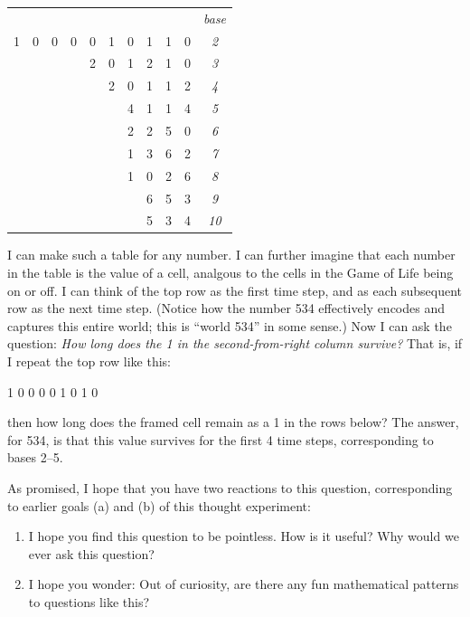 \documentclass[11pt, oneside]{article}
\begin{document}
\begin{center}
\begin{tabular}{cccccccccc|c}
  &   &   &   &   &   &   &   &   &   &\em base \\
1 & 0 & 0 & 0 & 0 & 1 & 0 & 1 & 1 & 0 & \it 2 \\
  &   &   &   & 2 & 0 & 1 & 2 & 1 & 0 & \it 3 \\
  &   &   &   &   & 2 & 0 & 1 & 1 & 2 & \it 4 \\
  &   &   &   &   &   & 4 & 1 & 1 & 4 & \it 5 \\
  &   &   &   &   &   & 2 & 2 & 5 & 0 & \it 6 \\
  &   &   &   &   &   & 1 & 3 & 6 & 2 & \it 7 \\
  &   &   &   &   &   & 1 & 0 & 2 & 6 & \it 8 \\
  &   &   &   &   &   &   & 6 & 5 & 3 & \it 9 \\
  &   &   &   &   &   &   & 5 & 3 & 4 & \it 10 \\
\end{tabular}
\end{center}

I can make such a table for any number.
I can further imagine that each number in the table is the value of a cell,
analgous to the cells in the Game of Life being on or off.
I can think of the
top row as the first time step, and as each subsequent row as the next time
step.
(Notice how the number 534 effectively encodes and captures this entire
world; this is ``world 534'' in some sense.)
Now I can ask the question:
{\em How long does the 1 in the second-from-right column survive?}
That is, if I repeat the top row like this:
\begin{center}
    1 0 0 0 0 1 0 1  0
\end{center}
then how long does the framed cell
remain as a 1 in the rows below?
The answer, for 534, is that this value survives for the first 4
time steps, corresponding to bases 2--5.

As promised, I hope that you have two reactions to this question, corresponding
to earlier goals (a) and (b) of this thought experiment:
\begin{enumerate}
    \item I hope you find this question to be pointless. How is it useful?
        Why would we ever ask this question?
    \item I hope you wonder:
        Out of curiosity, are there any fun mathematical patterns to questions
        like this?
\end{enumerate}
\end{document}
